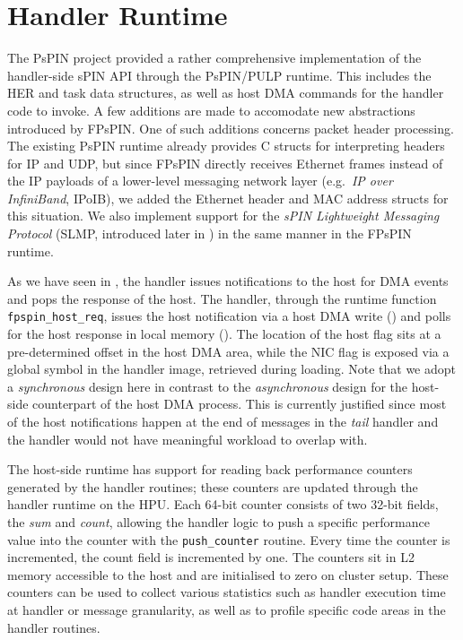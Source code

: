 \section{Handler Runtime} \label{sec:handler-runtime}

The PsPIN project provided a rather comprehensive implementation of the handler-side sPIN API through the PsPIN/PULP runtime.  This includes the HER and task data structures, as well as host DMA commands for the handler code to invoke.  A few additions are made to accomodate new abstractions introduced by FPsPIN.  One of such additions concerns packet header processing.  The existing PsPIN runtime already provides C structs for interpreting headers for IP and UDP, but since FPsPIN directly receives Ethernet frames instead of the IP payloads of a lower-level messaging network layer (e.g.\ \emph{IP over InfiniBand}, IPoIB), we added the Ethernet header and MAC address structs for this situation.  We also implement support for the \emph{sPIN Lightweight Messaging Protocol} (SLMP, introduced later in ) in the same manner in the FPsPIN runtime.

As we have seen in , the handler issues notifications to the host for DMA events and pops the response of the host.  The handler, through the runtime function \texttt{fpspin\_\-host\_\-req}, issues the host notification via a host DMA write () and polls for the host response in local memory ().  The location of the host flag sits at a pre-determined offset in the host DMA area, while the NIC flag is exposed via a global symbol in the handler image, retrieved during loading.  Note that we adopt a \emph{synchronous} design here in contrast to the \emph{asynchronous} design for the host-side counterpart of the host DMA process.  This is currently justified since most of the host notifications happen at the end of messages in the \emph{tail} handler and the handler would not have meaningful workload to overlap with.

The host-side runtime has support for reading back performance counters generated by the handler routines; these counters are updated through the handler runtime on the HPU.  Each 64-bit counter consists of two 32-bit fields, the \emph{sum} and \emph{count}, allowing the handler logic to push a specific performance value into the counter with the \texttt{push\_\-counter} routine.  Every time the counter is incremented, the count field is incremented by one.  The counters sit in L2 memory accessible to the host and are initialised to zero on cluster setup.  These counters can be used to collect various statistics such as handler execution time at handler or message granularity,  as well as to profile specific code areas in the handler routines.
